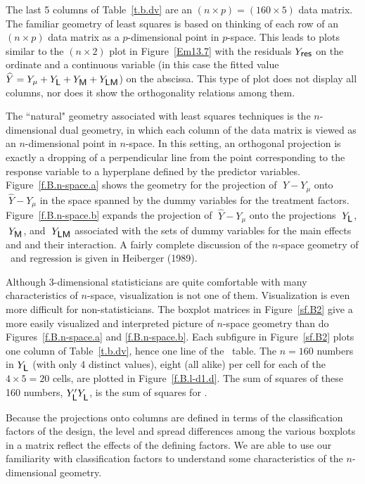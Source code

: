 The last 5 columns of Table~\ref{t.b.dv} are an $(n\times p) =
(160\times5)$ data matrix.
The familiar geometry of least squares is based on thinking of
each row of an $(n\times p)$ data matrix as a $p$-dimensional
point in $p$-space.  This leads to plots similar to the
$(n\times2)$ plot in Figure~\ref{Em13.7} with the
residuals $Y_{\mbox{{\protect\small\sf res}}}$ on the ordinate and a continuous
variable (in this case the fitted value
$\widehat Y= Y_{\mu} + Y_{\mbox{{\protect\small\sf L}}} + Y_{\mbox{{\protect\small\sf M}}} + Y_{\mbox{{\protect\small\sf LM}}}$)
on the abscissa.  This type of plot does not display all columns,
nor does it show the orthogonality relations among them.

The ``natural" geometry associated with least squares techniques is
the $n$-dimensional dual geometry, in which each column of the
data matrix is viewed as an $n$-dimensional point in $n$-space.
In this setting, an orthogonal projection is exactly a dropping
of a perpendicular line from the point corresponding to the
response variable to a hyperplane defined by the predictor
variables.  Figure~\ref{f.B.n-space.a} shows the geometry for the
projection of $\;Y - Y_\mu$ onto $\;\widehat Y - Y_\mu$ in
the space spanned by the dummy variables for the treatment factors.
Figure~\ref{f.B.n-space.b} expands the projection of
$\;\widehat Y - Y_\mu$ onto the projections
$\;Y_{\mbox{{\protect\small\sf L}}}$, $\;Y_{\mbox{{\protect\small\sf M}}}$, and $\;Y_{\mbox{{\protect\small\sf LM}}}$
associated with the sets of dummy variables for the main effects
 and  and their interaction.
A fairly complete discussion of the $n$-space
geometry of \ANOVA\ and regression is given in Heiberger (1989).

Although 3-dimensional statisticians are quite comfortable with
many characteristics of $n$-space, visualization is not one of
them.  Visualization is even more difficult for
non-statisticians.  The boxplot matrices in Figure~\ref{sf.B2}
give a more easily
visualized and interpreted picture of $n$-space geometry than
do Figures~\ref{f.B.n-space.a} and \ref{f.B.n-space.b}.
Each subfigure in
Figure~\ref{sf.B2} plots one column of Table~\ref{t.b.dv},
hence one line of the \ANOVA\ table.
The $n=160$ numbers in $Y_{\mbox{{\protect\small\sf L}}}$ (with only 4 distinct
values), eight
(all alike) per cell for each of the $4\times5=20$ cells,
are plotted in Figure~\ref{f.B.l-d1.d}.  The sum of squares of
these 160 numbers,
	  $ Y_{\mbox{\s{L}}}   ' Y_{\mbox{\s{L}}}^\pp$,
is the sum of squares for .

Because the projections onto columns are defined in terms of the
classification factors of the design, the level and spread
differences among the various boxplots in a matrix reflect the
effects of the defining factors.  We are able to use our
familiarity with classification factors to understand some
characteristics of the $n$-dimensional geometry.

